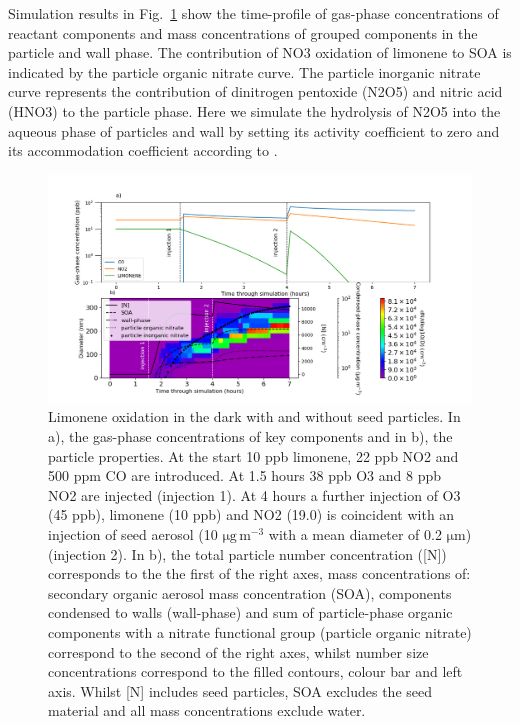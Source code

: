 \documentclass[gmd, manuscript]{copernicus}
\begin{document}
Simulation results in Fig.~\ref{fig:limonene_output_plot} show the time-profile of gas-phase concentrations of reactant components and mass concentrations of grouped components in the particle and wall phase.  The contribution of NO3 oxidation of limonene to SOA is indicated by the particle organic nitrate curve.  The particle inorganic nitrate curve represents the contribution of dinitrogen pentoxide (N2O5) and nitric acid (HNO3) to the particle phase.  Here we simulate the hydrolysis of N2O5 into the aqueous phase of particles and wall by setting its activity coefficient to zero and its accommodation coefficient according to \citet{Lowe2015}.  

\begin{figure}[t]
\includegraphics[width=12.0cm]{Results/limonene_res_plot.png}
\caption{Limonene oxidation in the dark with and without seed particles.  In a), the gas-phase concentrations of key components and in b), the particle properties.  At the start 10 ppb limonene, 22 ppb NO2 and 500 ppm CO are introduced.  At 1.5 hours 38 ppb O3 and 8 ppb NO2 are injected (injection 1).  At 4 hours a further injection of O3 (45 ppb), limonene (10 ppb) and NO2 (19.0) is coincident with an injection of seed aerosol (10 $\mathrm{\mu g\, m^{-3}}$ with a mean diameter of 0.2 $\mathrm{\mu m}$) (injection 2).  In b), the total particle number concentration ([N]) corresponds to the the first of the right axes,  mass concentrations of: secondary organic aerosol mass concentration (SOA), components condensed to walls (wall-phase) and sum of particle-phase organic components with a nitrate functional group (particle organic nitrate) correspond to the second of the right axes, whilst number size concentrations correspond to the filled contours, colour bar and left axis.  Whilst [N] includes seed particles, SOA excludes the seed material and all mass concentrations exclude water.}
\label{fig:limonene_output_plot}
\end{figure}
\end{document}
